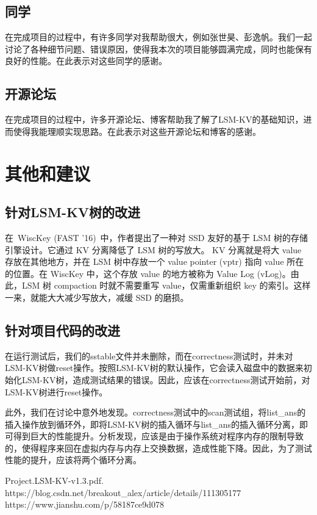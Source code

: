 \documentclass[UTF8]{ctexart}
\begin{document}
\subsection{同学}
在完成项目的过程中，有许多同学对我帮助很大，例如张世昊、彭逸帆。我们一起讨论了各种细节问题、错误原因，使得我本次的项目能够圆满完成，同时也能保有良好的性能。在此表示对这些同学的感谢。
\subsection{开源论坛}
在完成项目的过程中，许多开源论坛、博客帮助我了解了LSM-KV的基础知识，进而使得我能理顺实现思路。在此表示对这些开源论坛和博客的感谢。

\section{其他和建议}
\subsection{针对LSM-KV树的改进}
在 WiscKey (FAST '16) 中，作者提出了一种对 SSD 友好的基于 LSM 树的存储引擎设计。它通过 KV 分离降低了 LSM 树的写放大。 KV 分离就是将大 value 存放在其他地方，并在 LSM 树中存放一个 value pointer (vptr) 指向 value 所在的位置。在 WiscKey 中，这个存放 value 的地方被称为 Value Log (vLog)。由此，LSM 树 compaction 时就不需要重写 value，仅需重新组织 key 的索引。这样一来，就能大大减少写放大，减缓 SSD 的磨损。\cite{refweb2}
\subsection{针对项目代码的改进}
在运行测试后，我们的sstable文件并未删除，而在correctness测试时，并未对LSM-KV树做reset操作。按照LSM-KV树的默认操作，它会读入磁盘中的数据来初始化LSM-KV树，造成测试结果的错误。因此，应该在correctness测试开始前，对LSM-KV树进行reset操作。

此外，我们在讨论中意外地发现。correctness测试中的scan测试组，将list\_ans的插入操作放到循环外，即将LSM-KV树的插入循环与list\_ans的插入循环分离，即可得到巨大的性能提升。分析发现，应该是由于操作系统对程序内存的限制导致的，使得程序来回在虚拟内存与内存上交换数据，造成性能下降。因此，为了测试性能的提升，应该将两个循环分离。

\begin{thebibliography}{99}
    Project.LSM-KV-v1.3.pdf.
    https://blog.csdn.net/breakout\_alex/article/details/111305177
    https://www.jianshu.com/p/58187ce9d078
\end{thebibliography}
\end{document}
